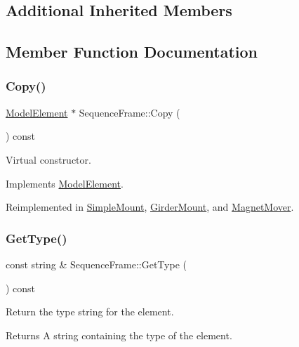 \subsection*{Additional Inherited Members}


\subsection{Member Function Documentation}
\mbox{\label{classSequenceFrame_a89a9046c330fa9955cd2e6b67b5c64f7}} 
\subsubsection{\texorpdfstring{Copy()}{Copy()}}
{\footnotesize\ttfamily \hyperlink{classModelElement}{Model\+Element} $\ast$ Sequence\+Frame\+::\+Copy (\begin{DoxyParamCaption}{ }\end{DoxyParamCaption}) const\hspace{0.3cm}{\ttfamily [virtual]}}

Virtual constructor. 

Implements \hyperlink{classModelElement_ac3ca26d649bd86a0f31a58ae09941429}{Model\+Element}.



Reimplemented in \hyperlink{classSimpleMount_a73ed116b3cceff1dd3cb71722f117139}{Simple\+Mount}, \hyperlink{classGirderMount_aa33c58a633237a7a54faa73ba73b4185}{Girder\+Mount}, and \hyperlink{classMagnetMover_aff87bd41b6b3f0e158ccfd4f2a03aaf5}{Magnet\+Mover}.

\mbox{\label{classSequenceFrame_a062ab78de738251ac5af6c62b470edcf}} 
\subsubsection{\texorpdfstring{Get\+Type()}{GetType()}}
{\footnotesize\ttfamily const string \& Sequence\+Frame\+::\+Get\+Type (\begin{DoxyParamCaption}{ }\end{DoxyParamCaption}) const\hspace{0.3cm}{\ttfamily [virtual]}}

Return the type string for the element. \begin{DoxyReturn}{Returns}
A string containing the type of the element. 
\end{DoxyReturn}


